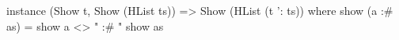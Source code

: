 \begin{code}
instance (Show t, Show (HList ts))
    => Show (HList (t ': ts)) where
  show (a :# as) = show a <> " :# " show as
\end{code}
